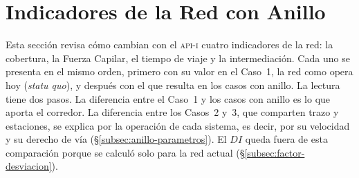 %
\section{Indicadores de la Red con Anillo}
\label{sec:anillo-indicadores}

Esta sección revisa cómo cambian con el \textsc{api-i} cuatro indicadores de
la red: la cobertura, la Fuerza Capilar, el tiempo de viaje y la
intermediación. Cada uno se presenta en el mismo orden, primero con su valor
en el Caso~1, la red como opera hoy (\textit{statu quo}), y después con el que
resulta en los casos con anillo. La lectura tiene dos pasos. La diferencia
entre el Caso~1 y los casos con anillo es lo que aporta el corredor. La
diferencia entre los Casos~2 y~3, que comparten trazo y estaciones, se explica
por la operación de cada sistema, es decir, por su velocidad y su derecho de
vía (§\ref{subsec:anillo-parametros}). El $DI$ queda fuera de esta
comparación porque se calculó solo para la red actual
(§\ref{subsec:factor-desviacion}).








